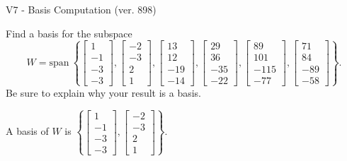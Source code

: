 \begin{exercise}
  \begin{exerciseTitle}V7 - Basis Computation (ver. 898)\end{exerciseTitle}
  \begin{exerciseStatement}
    Find a basis for the subspace 
\[W=\mathrm{span}\ \left\{\left[\begin{array}{r}
1 \\
-1 \\
-3 \\
-3
\end{array}\right] , \left[\begin{array}{r}
-2 \\
-3 \\
2 \\
1
\end{array}\right] , \left[\begin{array}{r}
13 \\
12 \\
-19 \\
-14
\end{array}\right] , \left[\begin{array}{r}
29 \\
36 \\
-35 \\
-22
\end{array}\right] , \left[\begin{array}{r}
89 \\
101 \\
-115 \\
-77
\end{array}\right] , \left[\begin{array}{r}
71 \\
84 \\
-89 \\
-58
\end{array}\right]\right\}.\]
 Be sure to explain why your result is a basis.


  \end{exerciseStatement}
  \begin{exerciseAnswer}
   A basis of \(W\) is  \(\left\{\left[\begin{array}{r}
1 \\
-1 \\
-3 \\
-3
\end{array}\right] , \left[\begin{array}{r}
-2 \\
-3 \\
2 \\
1
\end{array}\right]\right\}\).
  


  \end{exerciseAnswer}
\end{exercise}